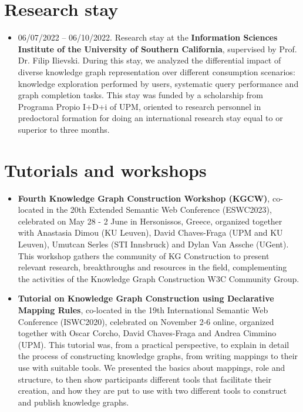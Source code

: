 \section{Research stay}
\begin{itemize}
    \item 06/07/2022 -- 06/10/2022. Research stay at the \textbf{Information Sciences Institute of the University of Southern California}, supervised by Prof. Dr. Filip Ilievski. During this stay, we analyzed the differential impact of diverse knowledge graph representation over different consumption scenarios: knowledge exploration performed by users, systematic query performance and graph completion tasks. This stay was funded by a scholarship from Programa Propio I+D+i of UPM, oriented to research personnel in predoctoral formation for doing an international research stay equal to or superior to three months.
\end{itemize}

\section{Tutorials and workshops}
\begin{itemize}
    \item \textbf{Fourth Knowledge Graph Construction Workshop (KGCW)}, co-located in the 20th Extended Semantic Web Conference (ESWC2023), celebrated on May 28 - 2 June in Hersonissos, Greece, organized together with Anastasia Dimou (KU Leuven), David Chaves-Fraga (UPM and KU Leuven), Umutcan Serles (STI Innsbruck) and Dylan Van Assche (UGent). This workshop gathers the community of KG Construction to present relevant research, breakthroughs and resources in the field, complementing the activities of the Knowledge Graph Construction W3C Community Group. 

    \item \textbf{Tutorial on Knowledge Graph Construction using Declarative Mapping Rules}, co-located in the 19th International Semantic Web Conference (ISWC2020), celebrated on November 2-6 online, organized together with Oscar Corcho, David Chaves-Fraga and Andrea Cimmino (UPM). This tutorial was, from a practical perspective, to explain in detail the process of constructing knowledge graphs, from writing mappings to their use with suitable tools. We presented the basics about mappings, role and structure, to then show participants different tools that facilitate their creation, and how they are put to use with two different tools to construct and publish knowledge graphs. 
\end{itemize}

